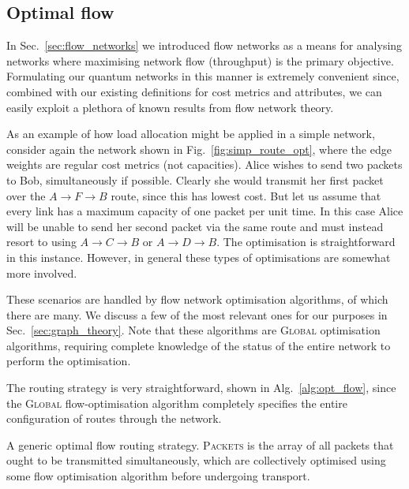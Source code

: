 \documentclass[aps,rmp,twocolumn,amsmath,amssymb,nofootinbib,superscriptaddress,longbibliography,floatfix,table-of-contents,eqsecnum]{revtex4-1}
\begin{document}
%
%

\subsection{Optimal flow} 

In Sec.~\ref{sec:flow_networks} we introduced flow networks as a means for analysing networks where maximising network flow (throughput) is the primary objective. Formulating our quantum networks in this manner is extremely convenient since, combined with our existing definitions for cost metrics and attributes, we can easily exploit a plethora of known results from flow network theory.

As an example of how load allocation might be applied in a simple network, consider again the network shown in Fig.~\ref{fig:simp_route_opt}, where the edge weights are regular cost metrics (not capacities). Alice wishes to send two packets to Bob, simultaneously if possible. Clearly she would transmit her first packet over the \mbox{$A\to F\to B$} route, since this has lowest cost. But let us assume that every link has a maximum capacity of one packet per unit time. In this case Alice will be unable to send her second packet via the same route and must instead resort to using \mbox{$A\to C \to B$} or \mbox{$A\to D\to B$}. The optimisation is straightforward in this instance. However, in general these types of optimisations are somewhat more involved.

These scenarios are handled by flow network optimisation algorithms, of which there are many. We discuss a few of the most relevant ones for our purposes in Sec.~\ref{sec:graph_theory}. Note that these algorithms are \textsc{Global} optimisation algorithms, requiring complete knowledge of the status of the entire network to perform the optimisation.

The routing strategy is very straightforward, shown in Alg.~\ref{alg:opt_flow}, since the \textsc{Global} flow-optimisation algorithm completely specifies the entire configuration of routes through the network.

\begin{table}[!htb]
\caption{A generic optimal flow routing strategy. \textsc{Packets} is the array of all packets that ought to be transmitted simultaneously, which are collectively optimised using some flow optimisation algorithm before undergoing transport.} \label{alg:opt_flow}
\end{table}
\end{document}
